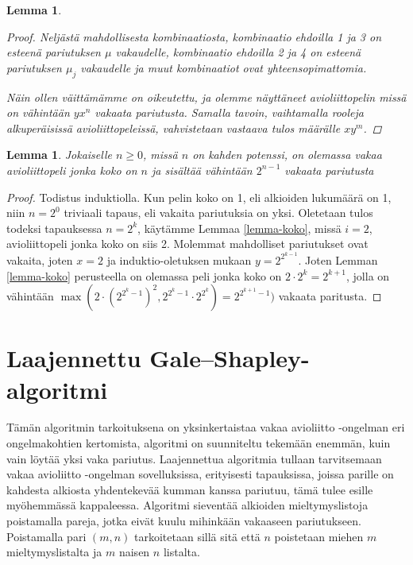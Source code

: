 \documentclass[finnish]{tktltiki2}
\newtheorem{lem}[lau]{Lemma}
\theoremstyle{definition}
\theoremstyle{remark}
\begin{document}
\begin{lem}
\begin{proof}
Neljästä mahdollisesta kombinaatiosta, kombinaatio ehdoilla 1 ja 3 on esteenä pariutuksen $\mu$ vakaudelle, kombinaatio ehdoilla 2 ja 4 on esteenä pariutuksen $\mu_j$ vakaudelle ja muut kombinaatiot ovat yhteensopimattomia.

Näin ollen väittämämme on oikeutettu, ja olemme näyttäneet avioliittopelin missä on vähintään $yx^n$ vakaata pariutusta. Samalla tavoin, vaihtamalla rooleja alkuperäisissä avioliittopeleissä, vahvistetaan vastaava tulos määrälle $xy^m$.
\end{proof}
\end{lem}

\begin{lem}\cite[p. 24]{gusfield1989stable}
Jokaiselle $n \geq 0$, missä $n$ on kahden potenssi, on olemassa vakaa avioliittopeli jonka koko on $n$ ja sisältää vähintään $2^{n-1}$ vakaata pariutusta
\end{lem}
\begin{proof}
Todistus induktiolla. Kun pelin koko on 1, eli alkioiden lukumäärä on 1, niin $n = 2^0$ triviaali tapaus, eli vakaita pariutuksia on yksi. Oletetaan tulos todeksi tapauksessa $n = 2^k$, käytämme Lemmaa \ref{lemma-koko}, missä $i = 2$, avioliittopeli jonka koko on siis 2. Molemmat mahdolliset pariutukset ovat vakaita, joten $x = 2$ ja induktio-oletuksen mukaan $y = 2^{2^{k-1}}$. Joten Lemman \ref{lemma-koko} perusteella on olemassa peli jonka koko on $2 \cdot 2^k = 2^{k+1}$, jolla on vähintään $\max(2 \cdot (2^{2^{{k}}-1})^2, 2^{2^{k}-1} \cdot 2^{2^{k}}) = 2^{2^{k+1}-1})$ vakaata paritusta.
\end{proof}

\section{Laajennettu Gale--Shapley-algoritmi}
Tämän algoritmin tarkoituksena on yksinkertaistaa vakaa avioliitto -ongelman eri ongelmakohtien kertomista, algoritmi on suunniteltu tekemään enemmän, kuin vain löytää yksi vaka pariutus. Laajennettua algoritmia tullaan tarvitsemaan vakaa avioliitto -ongelman sovelluksissa, erityisesti tapauksissa, joissa parille on kahdesta alkiosta yhdentekevää kumman kanssa pariutuu, tämä tulee esille myöhemmässä kappaleessa. Algoritmi sieventää alkioiden mieltymyslistoja poistamalla pareja, jotka eivät kuulu mihinkään vakaaseen pariutukseen. Poistamalla pari $(m, n)$ tarkoitetaan sillä sitä että $n$ poistetaan miehen $m$ mieltymyslistalta ja $m$ naisen $n$ listalta.
\end{document}
